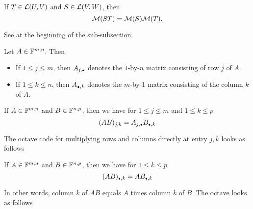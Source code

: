 \setcounter{thm}{42}
\begin{thm}
  If $T \in \mathcal{L}(U,V)$ and $S\in \mathcal{L}(V,W)$, then
  \begin{equation}
    \mathcal{M}(ST) = \mathcal{M}(S) \mathcal{M}(T).
  \end{equation}
\end{thm}
\begin{prf}
  See at the beginning of the sub-subsection.
\end{prf}

\begin{mydef}  Let $A\in \mathbb{F}^{m,n}$. Then
  \begin{itemize}
    \item If $1 \leq j \leq m$, then $A_{j, \mathsmaller{\bullet}}$ denotes the $1$-by-$n$ matrix consisting of row $j$ of $A$.
    \item If $1 \leq k \leq n$, then  $A_{\mathsmaller{\bullet}, k}$ denotes the $m$-by-$1$ matrix consisting of the column $k$ of $A$.
  \end{itemize}
\end{mydef}

\setcounter{thm}{45}
\begin{thm} 
  If $A \in \mathbb{F}^{m,n}$ and $B \in \mathbb{F}^{n,p}$, then we have for $1 \leq j \leq m$ and $1 \leq k \leq p$
  \begin{equation}
    (AB)_{j,k} = A_{j, \mathsmaller{\bullet}} B_{\mathsmaller{\bullet}, k}
  \end{equation}

  \begin{minipage}{\linewidth}
    The octave code for multiplying rows and columns directly at entry $j,k$ looks as follows

  \end{minipage}
\end{thm}

\setcounter{thm}{47}
\begin{thm}
  If $A \in \mathbb{F}^{m,n}$ and $B \in \mathbb{F}^{n,p}$, then we have for $1 \leq k \leq p$
  \begin{equation}
    (AB)_{\mathsmaller{\bullet}, k} = AB_{\mathsmaller{\bullet}, k}
  \end{equation}

  In other words, column $k$ of $AB$ equals $A$ times column $k$ of $B$. The octave looks as follows


\end{thm}

